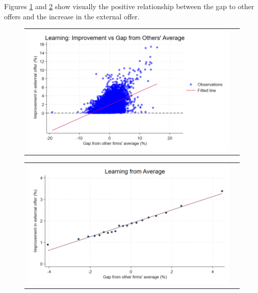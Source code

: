 \documentclass[12pt]{article}
\begin{document}
Figures \ref{fig:ie7_1} and \ref{fig:ie7_2} show visually the positive relationship between the gap to other offers and the increase in the external offer.
\begin{figure}[H]
\caption{}
\label{fig:ie7_1}
\centering{}%
\begin{tabular}{cc}
\includegraphics[scale=0.25]{../figures/IE7/IE7_learning_scatter_avg.png}
\end{tabular}
\end{figure}


\begin{figure}[H]
\caption{}
\label{fig:ie7_2}
\centering{}%
\begin{tabular}{cc}
\includegraphics[scale=0.25]{../figures/IE7/IE7_learning_binscatter_avg.png}
\end{tabular}
\end{figure}
\end{document}
